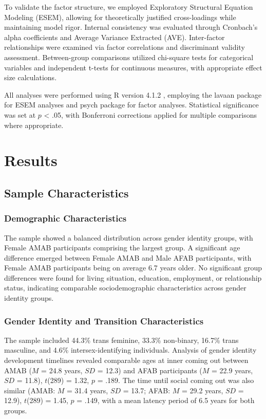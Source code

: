 \documentclass[12pt,a4paper]{article}
\begin{document}
To validate the factor structure, we employed Exploratory Structural Equation Modeling (ESEM), allowing for theoretically justified cross-loadings while maintaining model rigor. Internal consistency was evaluated through Cronbach's alpha coefficients and Average Variance Extracted (AVE). Inter-factor relationships were examined via factor correlations and discriminant validity assessment. Between-group comparisons utilized chi-square tests for categorical variables and independent t-tests for continuous measures, with appropriate effect size calculations.

All analyses were performed using R version 4.1.2 \parencite{RCore2021}, employing the lavaan package for ESEM analyses and psych package for factor analyses. Statistical significance was set at $p$ < .05, with Bonferroni corrections applied for multiple comparisons where appropriate.

\section{Results}

\subsection{Sample Characteristics}

\subsubsection{Demographic Characteristics}

The sample showed a balanced distribution across gender identity groups, with Female AMAB participants comprising the largest group. A significant age difference emerged between Female AMAB and Male AFAB participants, with Female AMAB participants being on average 6.7 years older. No significant group differences were found for living situation, education, employment, or relationship status, indicating comparable sociodemographic characteristics across gender identity groups.

\subsubsection{Gender Identity and Transition Characteristics}

The sample included 44.3\% trans feminine, 33.3\% non-binary, 16.7\% trans masculine, and 4.6\% intersex-identifying individuals. Analysis of gender identity development timelines revealed comparable ages at inner coming out between AMAB ($M$ = 24.8 years, $SD$ = 12.3) and AFAB participants ($M$ = 22.9 years, $SD$ = 11.8), $t$(289) = 1.32, $p$ = .189. The time until social coming out was also similar (AMAB: $M$ = 31.4 years, $SD$ = 13.7; AFAB: $M$ = 29.2 years, $SD$ = 12.9), $t$(289) = 1.45, $p$ = .149, with a mean latency period of 6.5 years for both groups.
\end{document}
